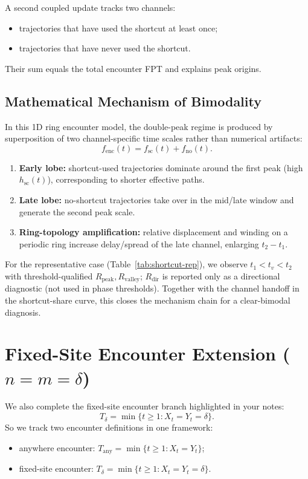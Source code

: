\documentclass[11pt]{article}
\begin{document}
A second coupled update tracks two channels:
\begin{itemize}[leftmargin=1.4em]
  \item trajectories that have used the shortcut at least once;
  \item trajectories that have never used the shortcut.
\end{itemize}
Their sum equals the total encounter FPT and explains peak origins.

\subsection*{Mathematical Mechanism of Bimodality}
In this 1D ring encounter model, the double-peak regime is produced by superposition of two channel-specific time scales rather than numerical artifacts:
\[
f_{\mathrm{enc}}(t)=f_{\mathrm{sc}}(t)+f_{\mathrm{no}}(t).
\]
\begin{enumerate}[leftmargin=1.4em]
  \item \textbf{Early lobe:} shortcut-used trajectories dominate around the first peak (high $h_{\mathrm{sc}}(t)$), corresponding to shorter effective paths.
  \item \textbf{Late lobe:} no-shortcut trajectories take over in the mid/late window and generate the second peak scale.
  \item \textbf{Ring-topology amplification:} relative displacement and winding on a periodic ring increase delay/spread of the late channel, enlarging $t_2-t_1$.
\end{enumerate}
For the representative case (Table~\ref{tab:shortcut-rep}), we observe $t_1<t_v<t_2$ with threshold-qualified
$R_{\mathrm{peak}},R_{\mathrm{valley}}$; $R_{\mathrm{dir}}$ is reported only as a directional diagnostic (not used in phase thresholds).
Together with the channel handoff in the shortcut-share curve, this closes the mechanism chain for a clear-bimodal diagnosis.

\section{Fixed-Site Encounter Extension (\texorpdfstring{$n=m=\delta$}{n=m=delta})}
We also complete the fixed-site encounter branch highlighted in your notes:
\[
T_\delta=\min\{t\ge1:X_t=Y_t=\delta\}.
\]
So we track two encounter definitions in one framework:
\begin{itemize}[leftmargin=1.4em]
  \item anywhere encounter: $T_{\mathrm{any}}=\min\{t\ge1:X_t=Y_t\}$;
  \item fixed-site encounter: $T_\delta=\min\{t\ge1:X_t=Y_t=\delta\}$.
\end{itemize}
\end{document}
